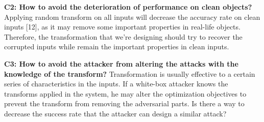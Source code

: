 \textbf{C2: How to avoid the deterioration of performance on clean objects?}
Applying random transform on all inputs will decrease the
accuracy rate on clean inputs [12], as it may remove some
important properties in real-life objects. Therefore, the transformation that we’re designing should try to recover the corrupted
inputs while remain the important properties in clean inputs.

\textbf{C3: How to avoid the attacker from altering the attacks
with the knowledge of the transform?}
Transformation is usually effective to a certain series of
characteristics in the inputs. If a white-box attacker knows the
transforms applied in the system, he may alter the optimization objectives to prevent the transform from removing the
adversarial parts. Is there a way to decrease the success rate
that the attacker can design a similar attack?


